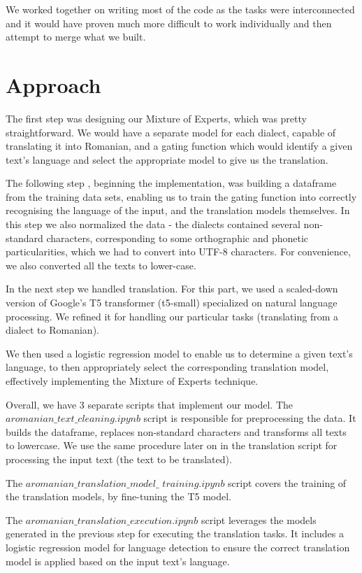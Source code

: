 \documentclass[11pt]{article}
\begin{document}
We worked together on writing most of the code as the tasks were interconnected and it would have proven much more difficult to work individually and then attempt to merge what we built.



\section{Approach}
\label{section:approach}

The first step was designing our Mixture of Experts, which was pretty straightforward. We would have a separate model for each dialect, capable of translating it into Romanian, and a gating function which would identify a given text's language and select the appropriate model to give us the translation. 

The following step , beginning the implementation, was building a dataframe from the training data sets, enabling us to train the gating function into correctly recognising the language of the input, and the translation models themselves. In this step we also normalized the data - the dialects contained several non-standard characters, corresponding to some orthographic and phonetic particularities, which we had to convert into UTF-8 characters. For convenience, we also converted all the texts to lower-case. 

In the next step we handled translation. For this part, we used a scaled-down version of Google's T5 transformer (t5-small) specialized on natural language processing. We refined it for handling our particular tasks (translating from a dialect to Romanian).

We then used a logistic regression model to enable us to determine a given text's language, to then appropriately select the corresponding translation model, effectively implementing the Mixture of Experts technique.

Overall, we have 3 separate scripts that implement our model. The $aromanian\_text\_cleaning.ipynb$ script is responsible for preprocessing the data. It builds the dataframe, replaces non-standard characters and transforms all texts to lowercase. We use the same procedure later on in the translation script for processing the input text (the text to be translated).

The $aromanian\_translation\_model\_$ $training.ipynb$ script covers the training of the translation models, by fine-tuning the T5 model. 

The $aromanian\_translation\_execution.ipynb$ script leverages the models generated in the previous step for executing the translation tasks. It includes a logistic regression model for language detection to ensure the correct translation model is applied based on the input text's language.
\end{document}
